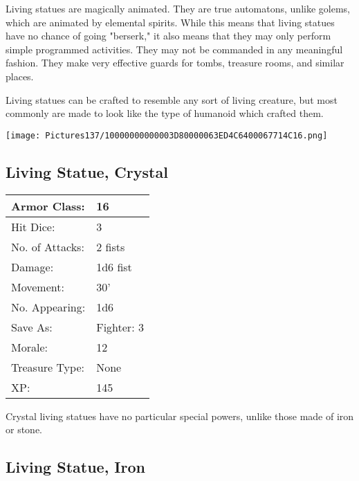 \documentclass[a4paper,twoside,openany,10pt]{book}
\begin{document}
\begin{multicols}{2}
Living statues are magically animated. They are true automatons, unlike golems, which are animated by elemental spirits. While this means that living statues have no chance of going "berserk," it also means that they may only perform simple programmed activities. They may not be commanded in any meaningful fashion. They make very effective guards for tombs, treasure rooms, and similar places.

Living statues can be crafted to resemble any sort of living creature, but most commonly are made to look like the type of humanoid which crafted them.

\vfill

\begin{center} \texttt{[image: Pictures137/10000000000003D80000063ED4C6400067714C16.png]} \end{center}

\columnbreak


\subsection*{Living Statue, Crystal}\label{living-statue-crystal}

\begin{tabularx}{0.50\textwidth}{@{}lX@{}}
Armor Class: & 16 \\\hline
Hit Dice: & 3 \\\hline
No. of Attacks: & 2 fists \\\hline
Damage: & 1d6 fist \\\hline
Movement: & 30' \\\hline
No. Appearing: & 1d6 \\\hline
Save As: & Fighter: 3 \\\hline
Morale: & 12 \\\hline
Treasure Type: & None \\\hline
XP: & 145 \\\hline
\end{tabularx}\medskip

Crystal living statues have no particular special powers, unlike those made of iron or stone.

\subsection*{Living Statue, Iron}\label{living-statue-iron}


\end{multicols}
\end{document}

